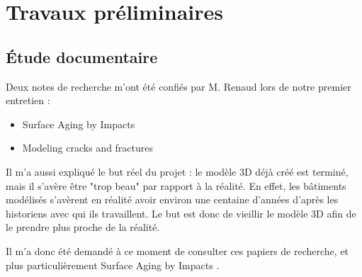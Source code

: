 \documentclass[a4paper,french]{article}
\begin{document}
	\section{Travaux préliminaires}
		\subsection{Étude documentaire}
			Deux notes de recherche m'ont été confiés par M. Renaud lors de notre premier entretien : 
				\begin{itemize}
					\item Surface Aging by Impacts \cite{PPD01}
					\item Modeling cracks and fractures \cite{Liris-6004}
				\end{itemize}\par
			Il m'a aussi expliqué le but réel du projet : le modèle 3D déjà créé est terminé, mais il s'avère être "trop beau" par rapport à la réalité. En effet, les bâtiments modélisés s'avèrent en réalité avoir environ une centaine d'années d'après les historiens avec qui ils travaillent. Le but est donc de vieillir le modèle 3D afin de le prendre plus proche de la réalité. \par
			Il m'a donc été demandé à ce moment de consulter ces papiers de recherche, et plus particulièrement Surface Aging by Impacts \cite{PPD01}.



		
\end{document}
